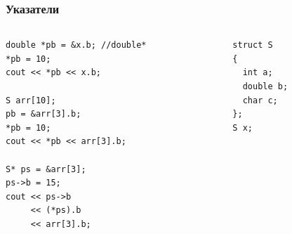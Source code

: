 \documentclass{beamer}
\begin{document}
\begin{frame}[fragile]
\frametitle{Указатели}


\begin{columns}[t]
  \begin{column}{0.7\textwidth}

\begin{flushleft}
\begin{lstlisting}
double *pb = &x.b; //double*
*pb = 10;
cout << *pb << x.b;

S arr[10];
pb = &arr[3].b;
*pb = 10;
cout << *pb << arr[3].b;

S* ps = &arr[3];
ps->b = 15;
cout << ps->b
     << (*ps).b
     << arr[3].b;

\end{lstlisting}
\end{flushleft}
  \end{column}
  \begin{column}{0.3\textwidth}

\begin{flushleft}
\begin{lstlisting}
struct S
{
  int a;
  double b;
  char c;
};
S x;
\end{lstlisting}
\end{flushleft}


  \end{column}
\end{columns}



\end{frame}
\end{document}

